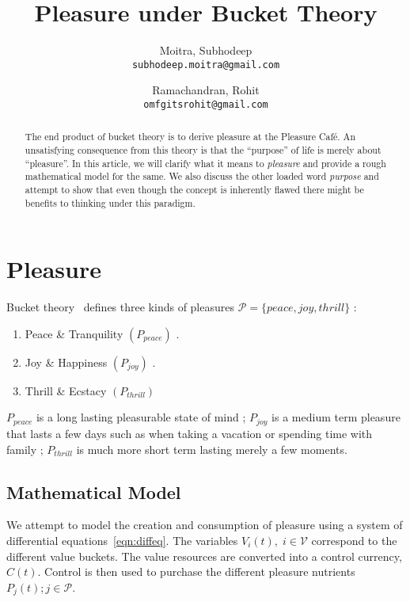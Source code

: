 \documentclass{article}
\begin{document}
\title{Pleasure under Bucket Theory}

\author{
	Moitra, Subhodeep \\ 
	{\tt subhodeep.moitra@gmail.com}
	\and
	Ramachandran, Rohit\\
	{\tt omfgitsrohit@gmail.com}
}

\maketitle

\begin{abstract}
The end product of bucket theory is to derive pleasure at the Pleasure Caf\'e. An unsatisfying consequence from this theory is that the ``purpose'' of life is merely about ``pleasure''. In this article, we will clarify what it means to \textit{pleasure} and provide a rough mathematical model for the same. We also discuss the other loaded word \textit{purpose} and attempt to show that even though the concept is inherently flawed there might be benefits to thinking under this paradigm.
\end{abstract}

\section{Pleasure}
Bucket theory~\cite{bucket2014} defines three kinds of pleasures $ \mathcal{P} = \{peace, joy, thrill \}$ : 
\begin{enumerate}
\item Peace \& Tranquility $(P_{peace})$ .
\item Joy \& Happiness  $(P_{joy})$ .
\item Thrill \& Ecstacy $(P_{thrill})$
\end{enumerate}

$P_{peace}$ is a long lasting pleasurable state of mind ; $P_{joy}$ is a medium term pleasure that lasts a few days such as when taking a vacation or spending time with family ;  $P_{thrill}$ is much more short term lasting merely a few moments. 

\subsection{Mathematical Model}
We attempt to model the creation and consumption of pleasure using a system of differential equations~\ref{eqn:diffeq}. The variables $V_i(t),\; i\in \mathcal{V}$ correspond to the different value buckets. The value resources are converted into a control currency, $C(t)$. Control is then used to purchase the different pleasure nutrients $P_j(t) ; j\in \mathcal{P}$.
\end{document}
